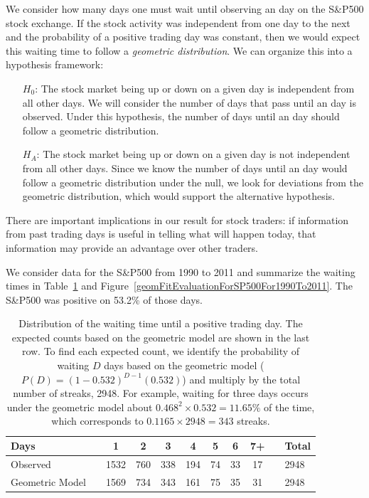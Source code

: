 We consider how many days one must wait until observing an  day on the S\&P500 stock exchange. If the stock activity was independent from one day to the next and the probability of a positive trading day was constant, then we would expect this waiting time to follow a \emph{geometric distribution}. We can organize this into a hypothesis framework:
\begin{itemize}
\item[$H_0$:] The stock market being up or down on a given day is independent from all other days. We will consider the number of days that pass until an  day is observed. Under this hypothesis, the number of days until an  day should follow a geometric distribution.
\item[$H_A$:] The stock market being up or down on a given day is not independent from all other days. Since we know the number of days until an  day would follow a geometric distribution under the null, we look for deviations from the geometric distribution, which would support the alternative hypothesis.
\end{itemize}
There are important implications in our result for stock traders: if information from past trading days is useful in telling what will happen today, that information may provide an advantage over other traders.

We consider data for the S\&P500 from 1990 to 2011 and summarize the waiting times in Table~\ref{sAndP500For1990To2011TimeToPosTrade2} and Figure~\ref{geomFitEvaluationForSP500For1990To2011}. The S\&P500 was positive on 53.2\% of those days.

\begin{table}
\centering
\begin{tabular}{ll ccc ccc c ll}
\hline
Days	 & \hspace{1mm} & 1 & 2 & 3 & 4 & 5 & 6 & 7+ & \hspace{1mm} & Total \\
\hline
Observed &		& 1532 & 760 & 338 & 194 & 74 & 33 & 17 & & 2948 \\
Geometric Model &		& 1569 & 734 & 343 & 161 & 75 & 35 & 31 & & 2948 \\
\hline
\end{tabular}
\caption{Distribution of the waiting time until a positive trading day. The expected counts based on the geometric model are shown in the last row. To find each expected count, we identify the probability of waiting $D$ days based on the geometric model ($P(D) = (1-0.532)^{D-1}(0.532)$) and multiply by the total number of streaks, 2948. For example, waiting for three days occurs under the geometric model about $0.468^2\times 0.532 = 11.65\%$ of the time, which corresponds to $0.1165\times 2948 = 343$ streaks.}
\label{sAndP500For1990To2011TimeToPosTrade2}
\end{table}


